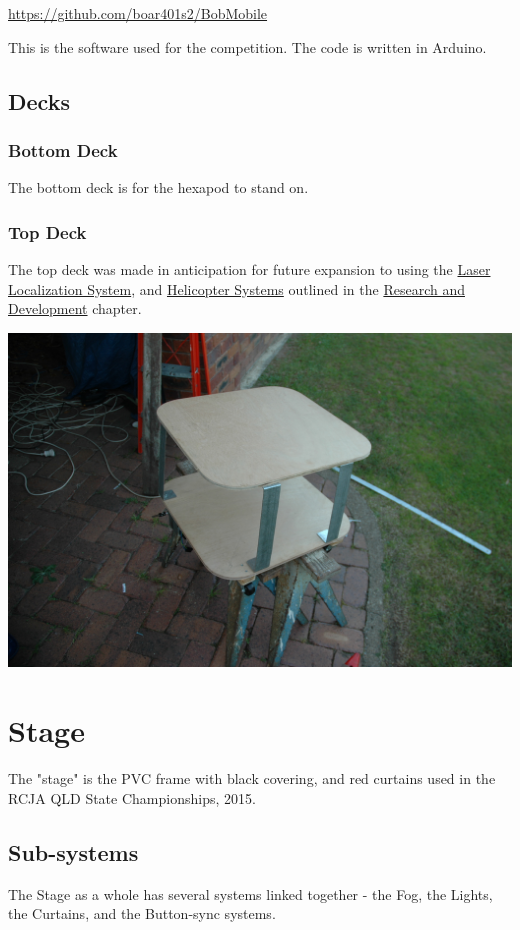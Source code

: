     			\url{https://github.com/boar401s2/BobMobile}
    			
    			This is the software used for the competition. The code is written in Arduino.\\
    	
    	\subsection{Decks}
    		\subsubsection{Bottom Deck}
    			The bottom deck is for the hexapod to stand on.\\
    			
    		\subsubsection{Top Deck}
    			The top deck was made in anticipation for future expansion to using the \hyperref[laser_localization]{Laser Localization System}, and \hyperref[helicopter_system]{Helicopter Systems} outlined in the \hyperref[RandD]{Research and Development} chapter.\\
    			
    			\centerline{\includegraphics[width=0.75\linewidth]{images/SecondDeck}}
    		
	\label{sec:Stage}            
    \section{Stage}
    	The "stage" is the PVC frame with black covering, and red curtains used in the RCJA QLD State Championships, 2015.
    	
    	\subsection{Sub-systems}
    		The Stage as a whole has several systems linked together - the Fog, the Lights, the Curtains, and the Button-sync systems.
            
